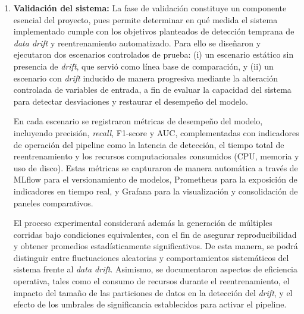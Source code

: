 \begin{enumerate}
    \textit{Se documentó cada versión del modelo, scripts de validación, configuraciones de ejecución de Jenkins y resultados comparativos.}

    \begin{figure}[H]
    \centering
    \caption{Diagrama: Pipeline de detección y reentrenamiento}
    \end{figure}

    \item \textbf{Validación del sistema:} 
    La fase de validación constituye un componente esencial del proyecto, pues permite determinar en qué medida el sistema implementado cumple con los objetivos planteados de detección temprana de \textit{data drift} y reentrenamiento automatizado. Para ello se diseñaron y ejecutaron dos escenarios controlados de prueba: (i) un escenario estático sin presencia de \textit{drift}, que servió como línea base de comparación, y (ii) un escenario con \textit{drift} inducido de manera progresiva mediante la alteración controlada de variables de entrada, a fin de evaluar la capacidad del sistema para detectar desviaciones y restaurar el desempeño del modelo.
    
    En cada escenario se registraron métricas de desempeño del modelo, incluyendo precisión, \textit{recall}, F1-score y AUC, complementadas con indicadores de operación del pipeline como la latencia de detección, el tiempo total de reentrenamiento y los recursos computacionales consumidos (CPU, memoria y uso de disco). Estas métricas se capturaron de manera automática a través de MLflow para el versionamiento de modelos, Prometheus para la exposición de indicadores en tiempo real, y Grafana para la visualización y consolidación de paneles comparativos.
    
    El proceso experimental considerará además la generación de múltiples corridas bajo condiciones equivalentes, con el fin de asegurar reproducibilidad y obtener promedios estadísticamente significativos. De esta manera, se podrá distinguir entre fluctuaciones aleatorias y comportamientos sistemáticos del sistema frente al \textit{data drift}. Asimismo, se documentaron aspectos de eficiencia operativa, tales como el consumo de recursos durante el reentrenamiento, el impacto del tamaño de las particiones de datos en la detección del \textit{drift}, y el efecto de los umbrales de significancia establecidos para activar el pipeline.
    

\end{enumerate}
